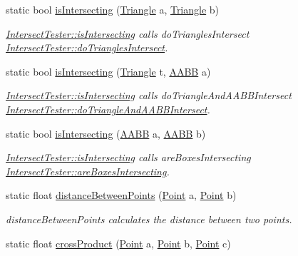 \begin{DoxyCompactItemize}
static bool \hyperlink{class_intersect_tester_a7195f2152c0c36590c2cdbd0e7365a3b}{is\+Intersecting} (\hyperlink{class_triangle}{Triangle} a, \hyperlink{class_triangle}{Triangle} b)
\begin{DoxyCompactList}\small\item\em \hyperlink{class_intersect_tester_a7710e17ff7d2e229059f23b9429213f5}{Intersect\+Tester\+::is\+Intersecting} calls do\+Triangles\+Intersect  \hyperlink{class_intersect_tester_a42709665c17cf203a7157466fdccd10f}{Intersect\+Tester\+::do\+Triangles\+Intersect}. \end{DoxyCompactList}\item 
static bool \hyperlink{class_intersect_tester_a7676eefb6df137a07551f4b49f8926a6}{is\+Intersecting} (\hyperlink{class_triangle}{Triangle} t, \hyperlink{class_a_a_b_b}{A\+A\+BB} a)
\begin{DoxyCompactList}\small\item\em \hyperlink{class_intersect_tester_a7710e17ff7d2e229059f23b9429213f5}{Intersect\+Tester\+::is\+Intersecting} calls do\+Triangle\+And\+A\+A\+B\+B\+Intersect  \hyperlink{class_intersect_tester_acb2dbd261f6351d83cf7471a972b5b52}{Intersect\+Tester\+::do\+Triangle\+And\+A\+A\+B\+B\+Intersect}. \end{DoxyCompactList}\item 
static bool \hyperlink{class_intersect_tester_a3996af79d5b862299a88dbb5705da88f}{is\+Intersecting} (\hyperlink{class_a_a_b_b}{A\+A\+BB} a, \hyperlink{class_a_a_b_b}{A\+A\+BB} b)
\begin{DoxyCompactList}\small\item\em \hyperlink{class_intersect_tester_a7710e17ff7d2e229059f23b9429213f5}{Intersect\+Tester\+::is\+Intersecting} calls are\+Boxes\+Intersecting  \hyperlink{class_intersect_tester_aff69bf4a84e714029204496c2efb0b3b}{Intersect\+Tester\+::are\+Boxes\+Intersecting}. \end{DoxyCompactList}\item 
static float \hyperlink{class_intersect_tester_a8eea20bc180b49008d29002fc4e2c7cf}{distance\+Between\+Points} (\hyperlink{class_point}{Point} a, \hyperlink{class_point}{Point} b)
\begin{DoxyCompactList}\small\item\em distance\+Between\+Points calculates the distance between two points. \end{DoxyCompactList}\item 
static float \hyperlink{class_intersect_tester_a1b966d15da1de1fab5350c8e81e0b70f}{cross\+Product} (\hyperlink{class_point}{Point} a, \hyperlink{class_point}{Point} b, \hyperlink{class_point}{Point} c)

\end{DoxyCompactItemize}
